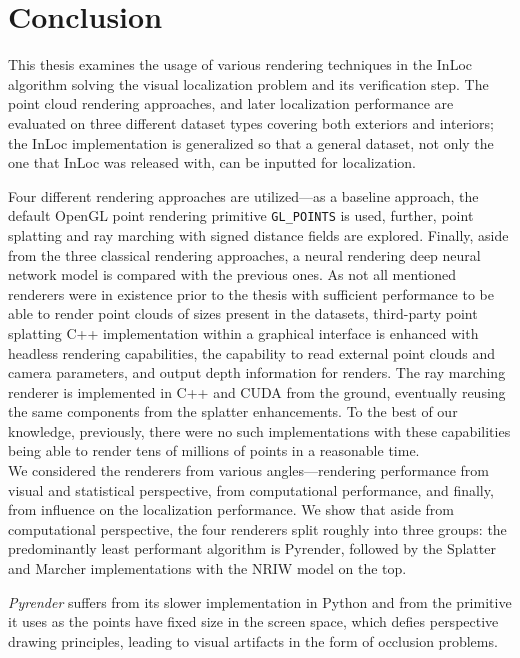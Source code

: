 \chapter*{Conclusion}

This thesis examines the usage of various rendering techniques in the InLoc
algorithm solving the visual localization problem and its verification step.
The point cloud rendering approaches, and later localization performance are
evaluated on three different dataset types covering both exteriors and
interiors; the InLoc implementation is generalized so that a general dataset,
not only the one that InLoc was released with, can be inputted for localization.

Four different rendering approaches are utilized---as a baseline approach,
the default OpenGL point rendering primitive \verb|GL_POINTS| is used, further,
point splatting and ray marching with signed distance fields are explored.
Finally, aside from the three classical rendering approaches, a neural
rendering deep neural network model is compared with the previous ones. As not
all mentioned renderers were in existence prior to the thesis with sufficient
performance to be able to render point clouds of sizes present in the datasets,
third-party point splatting C++ implementation within a graphical interface is
enhanced with headless rendering capabilities, the capability to read external point
clouds and camera parameters, and output depth information for renders. The ray
marching renderer is implemented in C++ and CUDA from the ground, eventually
reusing the same components from the splatter enhancements. To the best of our knowledge,
previously, there were no such implementations with these capabilities being able
to render tens of millions of points in a reasonable time.\\

We considered the renderers from various angles---rendering performance from visual
and statistical perspective, from computational performance, and finally, from
influence on the localization performance. We show that aside from computational
perspective, the four renderers split roughly into three groups: the predominantly
least performant algorithm is Pyrender, followed by the Splatter and Marcher
implementations with the NRIW model on the top.

\emph{Pyrender} suffers from its slower
implementation in Python and from the primitive it uses as the points have fixed
size in the screen space, which defies perspective drawing principles, leading to
visual artifacts in the form of occlusion problems.

